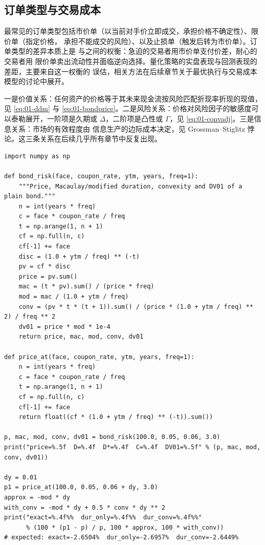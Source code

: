 \subsection{订单类型与交易成本}

最常见的订单类型包括市价单（以当前对手价立即成交，承担价格不确定性）、限价单（指定价格，
承担不能成交的风险）、以及止损单（触发后转为市价单）。订单类型的差异本质上是
与之间的权衡：急迫的交易者用市价单支付价差，耐心的交易者用
限价单卖出流动性并面临逆向选择。量化策略的实盘表现与回测表现的差距，主要来自这一权衡的
误估，相关方法在后续章节关于最优执行与交易成本模型的讨论中展开。

\begin{keybox}[本章的三个基础关系]
一是价值关系：任何资产的价格等于其未来现金流按风险匹配折现率折现的现值，见 \cref{eq:01-ddm}
与 \cref{eq:01-bondprice}。二是风险关系：价格对风险因子的敏感度可以泰勒展开，一阶项是久期或
$\Delta$，二阶项是凸性或 $\Gamma$，见 \cref{eq:01-convadj}。三是信息关系：市场的有效程度由
信息生产的边际成本决定，见 Grossman--Stiglitz 悖论。这三条关系在后续几乎所有章节中反复出现。
\end{keybox}

\begin{lstlisting}[style=pythonstyle,
                   caption={债券久期、凸性、DV01 与久期近似的数值验证},
                   label={lst:01-bond}]
import numpy as np

def bond_risk(face, coupon_rate, ytm, years, freq=1):
    """Price, Macaulay/modified duration, convexity and DV01 of a plain bond."""
    n = int(years * freq)
    c = face * coupon_rate / freq
    t = np.arange(1, n + 1)
    cf = np.full(n, c)
    cf[-1] += face
    disc = (1.0 + ytm / freq) ** (-t)
    pv = cf * disc
    price = pv.sum()
    mac = (t * pv).sum() / (price * freq)
    mod = mac / (1.0 + ytm / freq)
    conv = (pv * t * (t + 1)).sum() / (price * (1.0 + ytm / freq) ** 2) / freq ** 2
    dv01 = price * mod * 1e-4
    return price, mac, mod, conv, dv01

def price_at(face, coupon_rate, ytm, years, freq=1):
    n = int(years * freq)
    c = face * coupon_rate / freq
    t = np.arange(1, n + 1)
    cf = np.full(n, c)
    cf[-1] += face
    return float((cf * (1.0 + ytm / freq) ** (-t)).sum())

p, mac, mod, conv, dv01 = bond_risk(100.0, 0.05, 0.06, 3.0)
print("price=%.5f  D=%.4f  D*=%.4f  C=%.4f  DV01=%.5f" % (p, mac, mod, conv, dv01))

dy = 0.01
p1 = price_at(100.0, 0.05, 0.06 + dy, 3.0)
approx = -mod * dy
with_conv = -mod * dy + 0.5 * conv * dy ** 2
print("exact=%.4f%%  dur_only=%.4f%%  dur_conv=%.4f%%"
      % (100 * (p1 - p) / p, 100 * approx, 100 * with_conv))
# expected: exact=-2.6504%  dur_only=-2.6957%  dur_conv=-2.6449%
\end{lstlisting}

